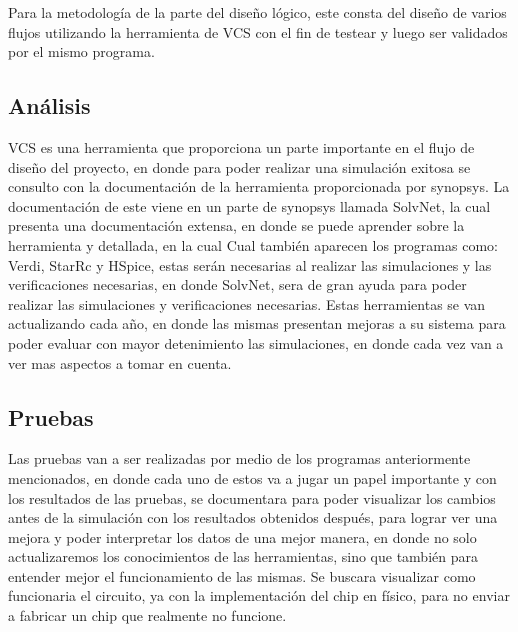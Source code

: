

Para la metodología de la parte del diseño lógico, este consta del diseño de varios flujos utilizando la herramienta de VCS con el fin de testear y luego ser validados por el mismo programa.

\subsection*{Análisis}
VCS es una herramienta que proporciona un parte importante en el flujo de diseño del proyecto, en donde para poder realizar una simulación exitosa se consulto con la documentación de la herramienta proporcionada por synopsys.
La documentación de este viene en un parte de synopsys llamada SolvNet, la cual presenta una documentación extensa, en donde se puede aprender sobre la herramienta y detallada, en la cual Cual también aparecen los programas como: Verdi, StarRc y HSpice, estas serán necesarias al realizar las simulaciones y las verificaciones necesarias, en donde SolvNet, sera de gran ayuda para poder realizar las simulaciones y verificaciones necesarias.
Estas herramientas se van actualizando cada año, en donde las mismas presentan mejoras a su sistema para poder evaluar con mayor detenimiento las simulaciones, en donde cada vez van a ver mas aspectos a tomar en cuenta.

\subsection*{Pruebas}
Las pruebas van a ser realizadas por medio de los programas anteriormente mencionados, en donde cada uno de estos va a jugar un papel importante y con los resultados de las pruebas, se documentara para poder visualizar los cambios antes de la simulación con los resultados obtenidos después, para lograr ver una mejora y poder interpretar los datos de una mejor manera, en donde no solo actualizaremos los conocimientos de las herramientas, sino que también para entender mejor el funcionamiento de las mismas. 
Se buscara visualizar como funcionaria el circuito, ya con la implementación del chip en físico, para no enviar a fabricar un chip que realmente no funcione.
